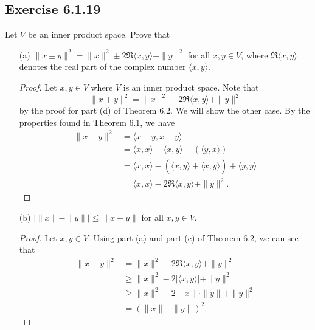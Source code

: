 \subsection*{Exercise 6.1.19} Let \( V  \) be an inner product space. Prove that
\begin{enumerate}
    \item[(a)] \( \|x \pm y\|^{2} = \|x\|^{2} \pm 2 \Re \langle x , y \rangle + \|y\|^{2}  \) for all \( x,y \in V  \), where \( \Re \langle x , y \rangle \) denotes the real part of the complex number \( \langle x , y \rangle \).
        \begin{proof}
        Let \( x,y \in V  \) where \( V  \) is an inner product space. Note that 
        \[  \|x + y\|^{2} = \|x\|^{2} + 2 \Re \langle x , y \rangle + \|y\|^{2} \]
        by the proof for part (d) of Theorem 6.2. We will show the other case. By the properties found in Theorem 6.1, we have
        \begin{align*}
            \|x - y\|^{2} &= \langle x - y  ,  x - y  \rangle \\
                          &= \langle x , x \rangle - \langle x , y \rangle - ( \langle y , x \rangle)  \\
                          &= \langle x , x \rangle - (\langle x , y \rangle + \overline{\langle x , y \rangle} ) + \langle y , y \rangle \\
                          &= \langle x , x \rangle - 2 \Re \langle x , y \rangle + \|y\|^{2}.
        \end{align*}
        \end{proof}
    \item[(b)] \( | \|x\| - \|y\| |  \leq \|x - y\| \) for all \( x,y \in V  \).
        \begin{proof}
            Let \( x,y \in V  \). Using part (a) and part (c) of Theorem 6.2, we can see that
            \begin{align*}
               \|x - y\|^{2}  &= \|x\|^{2} - 2 \Re \langle x , y \rangle + \|y\|^{2} \\
                              &\geq \|x\|^{2} - 2 |  \langle x , y \rangle | + \|y\|^{2} \\
                              &\geq \|x\|^{2} - 2 \|x\| \cdot \|y\| + \|y\|^{2} \tag{\( -2 | \langle x , y \rangle |  \geq -2 \|x\| \cdot \|y\| \)} \\ 
                              &= (\|x\| - \|y\|)^{2}.
            \end{align*}
        \end{proof}
\end{enumerate}


